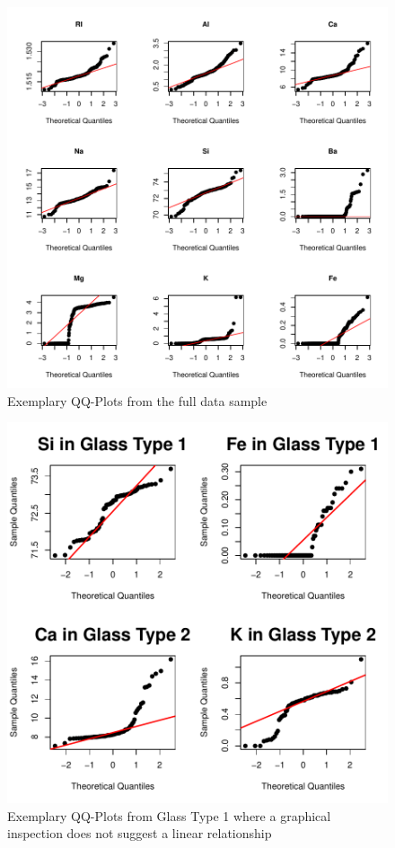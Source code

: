 \documentclass[a4paper, 12pt, titlepage, headsepline, listof = totoc, bibliography = totoc, numbers = noenddot]{scrartcl}
\begin{document}
\begin{figure}[h!]
\centering
\includegraphics[width=\textwidth]{report-QQfull}
\caption{Exemplary QQ-Plots from the full data sample}
\label{fig:QQfull}
\end{figure}


\begin{figure}[h!]
\centering
\includegraphics[width=\textwidth]{report-QQsamples}
\caption{Exemplary QQ-Plots from Glass Type 1 where a graphical inspection does not suggest a linear relationship}
\label{fig:QQsamples}
\end{figure}
\end{document}
